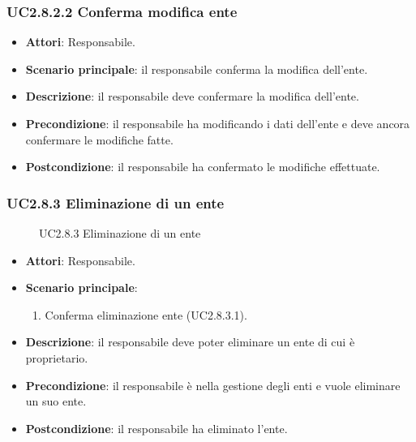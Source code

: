 \subsubsection{UC2.8.2.2 Conferma modifica ente}
\begin{itemize}
\item \textbf{Attori}: Responsabile.
\item \textbf{Scenario principale}: il responsabile conferma la modifica dell'ente.
\item \textbf{Descrizione}: il responsabile deve confermare la modifica dell'ente.
\item \textbf{Precondizione}: il responsabile ha modificando i dati dell'ente e deve ancora confermare le modifiche fatte.
\item \textbf{Postcondizione}: il responsabile ha confermato le modifiche effettuate.
\end{itemize}
\subsubsection{UC2.8.3 Eliminazione di un ente}
\begin{figure}[H]
\centering
\noindent{}
\caption{UC2.8.3 Eliminazione di un ente}
\end{figure}
\begin{itemize}
\item \textbf{Attori}: Responsabile.
\item \textbf{Scenario principale}:
\begin{enumerate}
\item Conferma eliminazione ente (UC2.8.3.1).
\end{enumerate}
\item \textbf{Descrizione}: il responsabile deve poter eliminare un ente di cui è proprietario.
\item \textbf{Precondizione}: il responsabile è nella gestione degli enti e vuole eliminare un suo ente.
\item \textbf{Postcondizione}: il responsabile ha eliminato l’ente.
\end{itemize}
